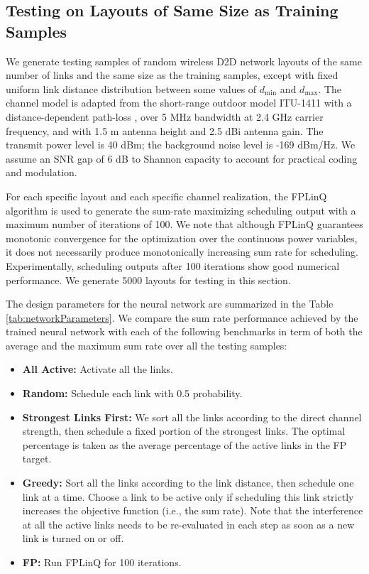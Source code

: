 \documentclass[journal,12pt,onecolumn,draftclsnofoot,]{IEEEtran}
\begin{document}
\subsection{Testing on Layouts of Same Size as Training Samples}

We generate testing samples of random wireless D2D network layouts of the same
number of links and the same size as the training samples, except with fixed
uniform link distance distribution between some values of $d_{\min}$ and
$d_{\max}$. The channel model is adapted from the short-range outdoor model
ITU-1411 with a distance-dependent path-loss \cite{itu1411}, over 5 MHz bandwidth at 2.4 GHz
carrier frequency, and with 1.5 m antenna height and 2.5 dBi antenna gain. The
transmit power level is 40 dBm; the background noise level is -169 dBm/Hz. We
assume an SNR gap of 6 dB to Shannon capacity to account for practical
coding and modulation.

For each specific layout and each specific channel realization, the FPLinQ
algorithm \cite{shen_ISIT17} is used to generate the sum-rate maximizing
scheduling output with a maximum number of iterations of 100.  We note that although
FPLinQ guarantees monotonic convergence for the optimization over the
continuous power variables, it does not necessarily produce monotonically
increasing sum rate for scheduling. Experimentally, scheduling outputs after
100 iterations show good numerical performance. We generate 5000 layouts for
testing in this section. 

The design parameters for the neural network are summarized in the Table
\ref{tab:networkParameters}. We compare the sum rate performance achieved by
the trained neural network with each of the following benchmarks in term of
both the average and the maximum sum rate over all the testing samples: 
\begin{itemize}
	\item {\bf All Active:} Activate all the links.
	\item {\bf Random:} Schedule each link with 0.5 probability.
	\item {\bf Strongest Links First:}
		We sort all the links according to the direct channel strength, then
		schedule a fixed portion of the strongest links. The optimal
		percentage is taken as the average percentage of the active links
		in the FP target.
	\item {\bf Greedy:} Sort all the links according to the link distance, then
schedule one link at a time. Choose a link to be active only if scheduling
this link strictly increases the objective function (i.e., the sum rate).
Note that the interference at all the active links needs to be re-evaluated in each
step as soon as a new link is turned on or off.
	\item {\bf FP:} Run FPLinQ for 100 iterations.
\end{itemize}
\end{document}
